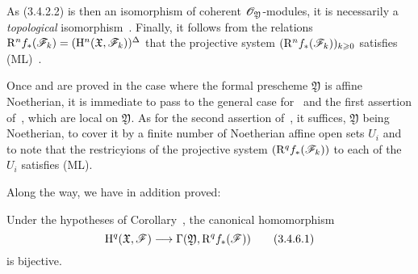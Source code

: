 \begin{env}[3.4.5]
As (3.4.2.2) is then an isomorphism of coherent $\mathscr{O}_\mathfrak{Y}$-modules, it is necessarily a \emph{topological} isomorphism~.
Finally, it follows from the relations $\mathrm{R}^n f_*(\mathscr{F}_k)=(\mathrm{H}^n(\mathfrak{X},\mathscr{F}_k))^\Delta$ that the projective system $(\mathrm{R}^n f_*(\mathscr{F}_k))_{k\geqslant 0}$ satisfies (ML)~.

Once  and  are proved in the case where the formal prescheme $\mathfrak{Y}$ is affine Noetherian, it is immediate to pass to the general case for~ and the first assertion of~, which are local on $\mathfrak{Y}$.
As for the second assertion of~, it suffices, $\mathfrak{Y}$ being Noetherian, to cover it by a finite number of Noetherian affine open sets $U_i$ and to note that the restricyions of the projective system $(\mathrm{R}^q f_*(\mathscr{F}_k))$ to each of the $U_i$ satisfies (ML).
\end{env}

Along the way, we have in addition proved:
\begin{corollary}[3.4.6]
\label{III.3.4.6}
Under the hypotheses of Corollary~, the canonical homomorphism
\[
\label{III.3.4.6.1}
  \HH^q(\mathfrak{X},\sh{F})\to\Gamma(\mathfrak{Y},\RR^q f_*(\sh{F}))
  \tag{3.4.6.1}
\]
is bijective.
\end{corollary}

